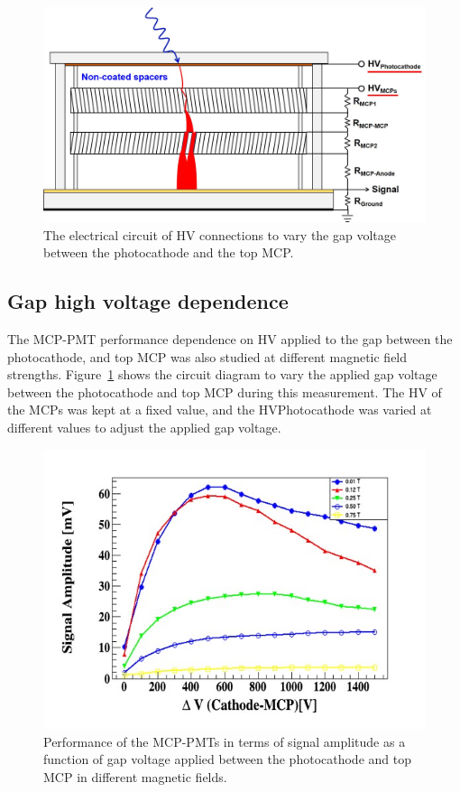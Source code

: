 \documentclass[preprint,5p]{elsarticle}
\begin{document}
\begin{figure}[tbp]
\centering \includegraphics[scale=0.32]{fig/Figure7.jpg}
\caption{The electrical circuit of HV connections to vary the gap voltage 
   between the photocathode and the top MCP.} \label{fig:7}
\end{figure}

\subsection{Gap high voltage dependence} \label{}
The MCP-PMT performance dependence on HV applied to the gap between the 
photocathode, and top MCP was also studied at different magnetic field 
strengths. Figure~\ref{fig:7} shows the circuit diagram to vary the applied gap 
voltage between the photocathode and top MCP during this measurement. The HV of 
the MCPs was kept at a fixed value, and the HVPhotocathode was varied at 
different values to adjust the applied gap voltage. 

\begin{figure}[tbp]
\centering \includegraphics[scale=0.6]{fig/Figure8.jpg}
\caption{Performance of the MCP-PMTs in terms of signal amplitude as a function 
   of gap voltage applied between the photocathode and top MCP in different 
   magnetic fields.} \label{fig:8}
\end{figure} 
\end{document}
